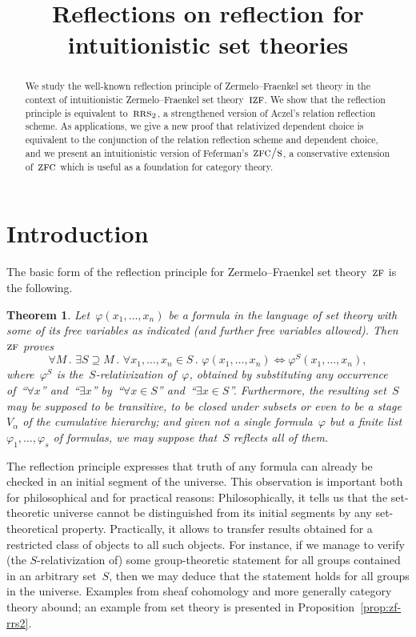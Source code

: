 \documentclass[oneside,reqno]{amsart}
\title[Reflections on reflection for intuitionistic set theories]{Reflections on reflection for \\ intuitionistic set theories}
\author{}
\theoremstyle{definition}
\theoremstyle{plain}
\newtheorem{thm}[defn]{Theorem}
\theoremstyle{remark}
\renewcommand{\_}{\mathpunct{.}\,}
\newcommand{\?}{\,{:}\,}
\newcommand{\ZF}{\textsc{zf}}
\newcommand{\IZF}{\textsc{izf}}
\newcommand{\ZFC}{\textsc{zfc}}
\newcommand{\ZFCS}{\textsc{zfc/s}}
\newcommand{\RRS}{\textsc{rrs}}
\begin{document}
\begin{abstract}
  We study the well-known reflection principle of Zermelo--Fraenkel set theory
  in the context of intuitionistic Zermelo--Fraenkel set theory~$\IZF$. We show
  that the reflection principle is equivalent to~$\RRS_2$, a strengthened
  version of Aczel's relation reflection scheme. As
  applications, we give a new proof that relativized dependent choice is
  equivalent to the conjunction of the relation reflection scheme and dependent
  choice, and we present an intuitionistic version of Feferman's~$\ZFCS$, a
  conservative extension of~$\ZFC$ which is useful as a foundation for category
  theory.
\end{abstract}

\maketitle
\thispagestyle{empty}

\section{Introduction}

The basic form of the reflection principle for Zermelo--Fraenkel set
theory~$\ZF$ is the following.
\begin{thm}Let~$\varphi(x_1,\ldots,x_n)$ be a formula in the language of set
theory with some of its free variables as indicated (and further free variables
allowed). Then~$\ZF$ proves
\[ \forall M\_
  \exists S \supseteq M\_
  \forall x_1,\ldots,x_n \in S\_
  \varphi(x_1,\ldots,x_n) \Leftrightarrow \varphi^S(x_1,\ldots,x_n), \]
where~$\varphi^S$ is the~$S$-relativization of~$\varphi$, obtained by
substituting any occurrence of~``$\forall x$'' and~``$\exists x$'' by~``$\forall
x \in S$'' and~``$\exists x \in S$''.
Furthermore, the resulting set~$S$ may be supposed to be transitive, to be closed
under subsets or even to be a stage~$V_\alpha$ of the cumulative hierarchy;
and given not a single formula~$\varphi$ but a finite
list~$\varphi_1,\ldots,\varphi_s$ of formulas, we may suppose that~$S$ reflects
all of them.
\end{thm}

The reflection principle expresses that truth of any formula can already be
checked in an initial segment of the universe. This observation
is important both for philosophical and for practical
reasons: Philosophically, it tells us that the set-theoretic universe cannot be
distinguished from its initial segments by any set-theoretical property.
Practically, it allows to
transfer results obtained for a restricted class of objects to all such
objects. For instance, if we manage to verify (the $S$-relativization of) some
group-theoretic statement for all groups contained in an arbitrary set~$S$,
then we may deduce that the statement holds
for all groups in the universe. Examples from sheaf cohomology and more
generally category theory abound; an example from set theory is presented in
Proposition~\ref{prop:zf-rrs2}.
\end{document}
